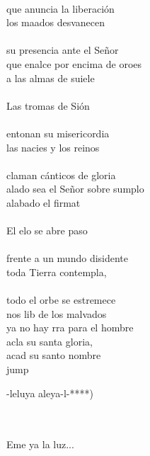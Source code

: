 \begin{cancion}
	\jump\\
que anuncia la liberación\\
	los maados desvanecen \\
	\jump\\
su presencia ante el Señor\\
	que enalce por encima de oroes\\
	a las almas de suiele\\
	\jump\\
	Las tromas de Sión \\
	\jump\\
entonan su misericordia\\
	las nacies y los reinos \\
	\jump\\
claman cánticos de gloria\\
	alado sea el Señor sobre sumplo\\
	alabado el firmat\\
	\jump\\
	El elo se abre paso \\
	\jump\\
frente a un mundo disidente\\
	toda  Tierra contempla, \\
	\jump\\
todo el orbe se estremece\\
	nos lib de los malvados  \\
	ya no hay rra para el hombre\\
	acla su santa gloria,\\
	 acad su santo nombre\\jump\\
	\begin{chorus}%
	-leluya aleya-l-*)\\
	\end{chorus}%
	\jump\\
	\jump\\
	Eme ya la luz...\\
	\jump\\
\end{cancion}%
